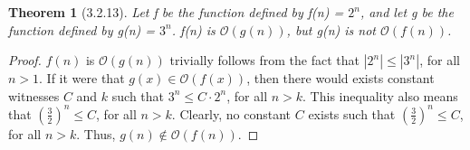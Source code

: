 \documentclass[a4paper, 12pt]{article}
\theoremstyle{plain}
\newtheorem*{theorem*}{Theorem}
\begin{document}
	
	\begin{theorem*}[3.2.13]
		Let f be the function defined by f(n) = $2^{n}$, and let g be the function defined by g(n) = $3^{n}$. f(n) is $\mathcal{O}(g(n))$, but g(n) is not $\mathcal{O}(f(n))$.
	\end{theorem*}
	
	\begin{proof}
		$f(n)$ is $\mathcal{O}(g(n))$ trivially follows from the fact that $|2^{n}| \le |3^{n}|$, for all $n > 1$. \newline \indent If it were that $g(x) \in \mathcal{O}(f(x))$, then there would exists constant witnesses $C$ and $k$ such that $3^{n} \le C \cdot 2^{n}$, for all $n > k$. This inequality also means that $\left( \frac{3}{2} \right)^{n} \le C$, for all $n > k$. Clearly, no constant $C$ exists such that $\left( \frac{3}{2} \right)^{n} \le C$, for all $n > k$. Thus, $g(n) \notin \mathcal{O}(f(n))$.
	\end{proof}
\end{document}
